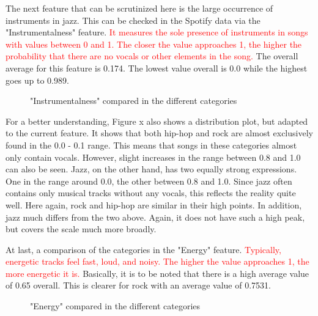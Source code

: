 The next feature that can be scrutinized here is the large occurrence of instruments in jazz.
This can be checked in the Spotify data via the "Instrumentalness" feature.
\textcolor{red}{It measures the sole presence of instruments in songs with values between 0 and 1.
The closer the value approaches 1, the higher the probability that there are no vocals or other
elements in the song.} The overall average for this feature is 0.174.
The lowest value overall is 0.0 while the highest goes up to 0.989.

\begin{figure}[H]
    \centering
    \qquad
    \caption{"Instrumentalness" compared in the different categories}%
    \label{du_dp_bp_instr_categorie_dependent}%
\end{figure}

For a better understanding, Figure x  also shows a distribution plot,
but adapted to the current feature.
It shows that both hip-hop and rock are almost exclusively found in the 0.0 - 0.1 range.
This means that songs in these categories almost only contain vocals.
However, slight increases in the range between 0.8 and 1.0 can also be seen. Jazz,
on the other hand, has two equally strong expressions. One in the range around 0.0,
the other between 0.8 and 1.0. Since jazz often contains only musical tracks without
any vocals, this reflects the reality quite well.
Here again, rock and hip-hop are similar in their high points.
In addition, jazz much differs from the two above. Again, it does not have such a high peak, 
but covers the scale much more broadly.

At last, a comparison of the categories in the "Energy" feature.
\textcolor{red}{Typically, energetic tracks feel fast, loud, and noisy.
The higher the value approaches 1, the more energetic it is.}
Basically, it is to be noted that there is a high average value of 0.65 overall.
This is clearer for rock with an average value of 0.7531.

\begin{figure}[H]
    \centering
    \qquad
    \caption{"Energy" compared in the different categories}%
    \label{du_dp_bp_enrg_categorie_dependent}%
\end{figure}

